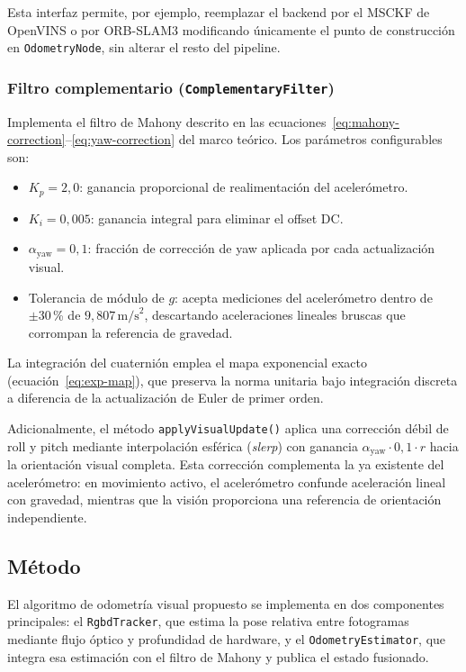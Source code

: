 Esta interfaz permite, por ejemplo, reemplazar el backend por el MSCKF de
OpenVINS \cite{Mourikis2007} o por ORB-SLAM3 \cite{Mur2015ORB} modificando
únicamente el punto de construcción en \texttt{OdometryNode}, sin alterar
el resto del pipeline.

\subsubsection{Filtro complementario (\texttt{ComplementaryFilter})}

Implementa el filtro de Mahony descrito en las
ecuaciones~\ref{eq:mahony-correction}--\ref{eq:yaw-correction} del marco
teórico. Los parámetros configurables son:
\begin{itemize}
  \item $K_p = 2{,}0$: ganancia proporcional de realimentación del
    acelerómetro.
  \item $K_i = 0{,}005$: ganancia integral para eliminar el offset DC.
  \item $\alpha_{\text{yaw}} = 0{,}1$: fracción de corrección de yaw aplicada
    por cada actualización visual.
  \item Tolerancia de módulo de $g$: acepta mediciones del acelerómetro
    dentro de $\pm 30\,$\% de $9{,}807\,\text{m/s}^2$, descartando
    aceleraciones lineales bruscas que corrompan la referencia de gravedad.
\end{itemize}

La integración del cuaternión emplea el mapa exponencial exacto
(ecuación~\ref{eq:exp-map}), que preserva la norma unitaria bajo integración
discreta a diferencia de la actualización de Euler de primer orden.

Adicionalmente, el método \texttt{applyVisualUpdate()} aplica una corrección
débil de roll y pitch mediante interpolación esférica (\emph{slerp}) con
ganancia $\alpha_{\text{yaw}} \cdot 0{,}1 \cdot r$ hacia la orientación visual
completa. Esta corrección complementa la ya existente del acelerómetro: en
movimiento activo, el acelerómetro confunde aceleración lineal con gravedad,
mientras que la visión proporciona una referencia de orientación independiente.

\subsection{Método}
\label{sec:lm-vio-metodo}

El algoritmo de odometría visual propuesto se implementa en dos componentes
principales: el \texttt{RgbdTracker}, que estima la pose relativa entre
fotogramas mediante flujo óptico y profundidad de hardware, y el
\texttt{OdometryEstimator}, que integra esa estimación con el filtro de
Mahony y publica el estado fusionado.

